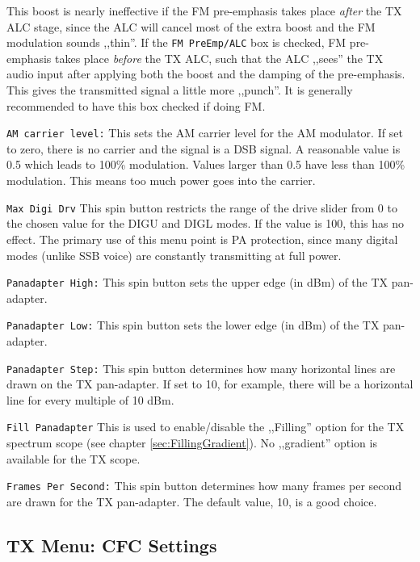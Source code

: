\documentclass[12pt]{book}
\def\rett#1{\texttt{\color{red}#1}}
\begin{document}
This boost is nearly ineffective if the FM pre-emphasis takes place \textit{after}
the TX ALC stage, since the ALC will cancel most of the extra boost and the FM
modulation sounds ,,thin''. If the \rett{FM PreEmp/ALC} box is checked, FM
pre-emphasis takes place \textit{before} the TX ALC, such that the ALC ,,sees''
the TX audio input after applying both the boost and the damping of the pre-emphasis. This gives the
transmitted signal a little more ,,punch''. It is generally recommended to have this box checked
if doing FM.

\rett{AM carrier level:} This sets the AM carrier level for the AM modulator. If set to zero, there is no
carrier and the
signal is a DSB signal. A reasonable value is 0.5 which leads to 100\% modulation. Values larger than
0.5 have less than 100\% modulation. This means too much power goes into the carrier.

\rett{Max Digi Drv} This spin button restricts the range of the drive slider from 0 to the
chosen value
for the DIGU and DIGL modes. If the value is 100, this has no effect. The primary use of this menu point is
PA protection,
since many digital modes (unlike SSB voice) are constantly transmitting at full power.

\rett{Panadapter High:} This spin button sets the upper edge (in dBm) of the TX pan-adapter.

\rett{Panadapter Low:} This spin button sets the lower edge (in dBm) of the TX pan-adapter.

\rett{Panadapter Step:} This spin button determines how many horizontal lines are drawn on the
TX pan-adapter. If set to 10, for example, there will be a horizontal line for every multiple
of 10 dBm.

\rett{Fill Panadapter} This is used to enable/disable the ,,Filling'' option
for the TX  spectrum scope (see chapter \ref{sec:FillingGradient}). No ,,gradient''
option is available for the TX scope.

\rett{Frames Per Second:} This spin button determines how many frames per second are drawn for the TX
pan-adapter. The default value, 10, is a good choice.

\subsection{TX Menu: CFC Settings}
\label{sec:cfc}
\end{document}
